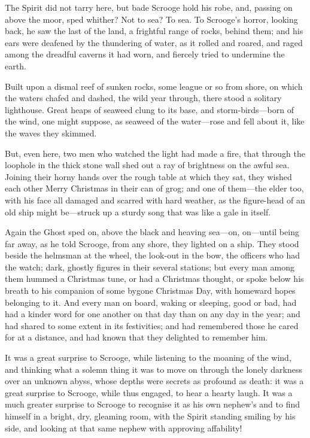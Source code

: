 \documentclass[paper=a5,BCOR=15mm,twoside,DIV=15,headinclude=off,12pt,chapterprefix=off,openany,headings=huge]{scrbook} %
\begin{document}
The Spirit did not tarry here, but bade Scrooge hold his robe, and, passing on above the moor, sped whither? Not to sea? To sea. To Scrooge's horror, looking back, he saw the last of the land, a frightful range of rocks, behind them; and his ears were deafened by the thundering of water, as it rolled and roared, and raged among the dreadful caverns it had worn, and fiercely tried to undermine the earth.

Built upon a dismal reef of sunken rocks, some league or so from shore, on which the waters chafed and dashed, the wild year through, there stood a solitary lighthouse. Great heaps of seaweed clung to its base, and storm-birds—born of the wind, one might suppose, as seaweed of the water—rose and fell about it, like the waves they skimmed.

But, even here, two men who watched the light had made a fire, that through the loophole in the thick stone wall shed out a ray of brightness on the awful sea. Joining their horny hands over the rough table at which they sat, they wished each other Merry Christmas in their can of grog; and one of them—the elder too, with his face all damaged and scarred with hard weather, as the figure-head of an old ship might be—struck up a sturdy song that was like a gale in itself.

Again the Ghost sped on, above the black and heaving sea—on, on—until being far away, as he told Scrooge, from any shore, they lighted on a ship. They stood beside the helmsman at the wheel, the look-out in the bow, the officers who had the watch; dark, ghostly figures in their several stations; but every man among them hummed a Christmas tune, or had a Christmas thought, or spoke below his breath to his companion of some bygone Christmas Day, with homeward hopes belonging to it. And every man on board, waking or sleeping, good or bad, had had a kinder word for one another on that day than on any day in the year; and had shared to some extent in its festivities; and had remembered those he cared for at a distance, and had known that they delighted to remember him.

It was a great surprise to Scrooge, while listening to the moaning of the wind, and thinking what a solemn thing it was to move on through the lonely darkness over an unknown abyss, whose depths were secrets as profound as death: it was a great surprise to Scrooge, while thus engaged, to hear a hearty laugh. It was a much greater surprise to Scrooge to recognise it as his own nephew's and to find himself in a bright, dry, gleaming room, with the Spirit standing smiling by his side, and looking at that same nephew with approving affability!
\end{document}
